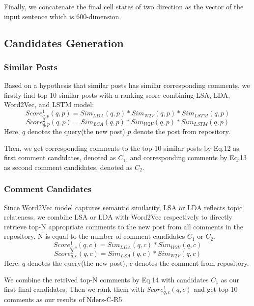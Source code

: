 \documentclass{sig-alternate}
\begin{document}
Finally, we concatenate the final cell states of two direction as the vector of 
the input sentence which is 600-dimension.

\subsection{Candidates Generation}

\subsubsection{Similar Posts}
Based on a hypothesis that similar posts has similar corresponding comments, we firstly find top-10 similar posts with a ranking score combining LSA, LDA, Word2Vec, and LSTM model:
\begin{equation}
   Score_{q,p}^1(q, p) = Sim_{LDA}(q, p) * Sim_{W2V}(q, p) * Sim_{LSTM}(q, p)
\end{equation}
\begin{equation}
   Score_{q,p}^2(q, p) = Sim_{LSA}(q, p) * Sim_{W2V}(q, p) * Sim_{LSTM}(q, p)
\end{equation}
Here, $q$ denotes the query(the new post) $p$ denote the post from repository.

Then, we get corresponding comments to the top-10 similar posts by Eq.12 as 
first comment candidates, denoted as $C_1$, and corresponding comments by 
Eq.13 as second comment candidates, denoted as $C_2$.

\subsubsection{Comment Candidates}
Since Word2Vec model captures semantic similarity, LSA or LDA reflects topic relateness, we combine LSA or LDA with Word2Vec respectively to directly retrieve top-N appropriate comments to the new post from all comments in the repository. N is equal to the number of comment candidates $C_1$ or $C_2$. 
\begin{equation}
   Score_{q,c}^1(q, c) = Sim_{LDA}(q, c) * Sim_{W2V}(q, c)
\end{equation}
\begin{equation}
   Score_{q,c}^2(q, c) = Sim_{LSA}(q, c) * Sim_{W2V}(q, c)
\end{equation}
Here, $q$ denotes the query(the new post), $c$ denotes the comment from repository.

We combine the retrived top-N comments by Eq.14 with candidates $C_1$ as our 
first final candidates. Then we rank them with $Score_{q,c}^1(q, c)$ and get 
top-10 comments as our results of Nders-C-R5.
\end{document}
